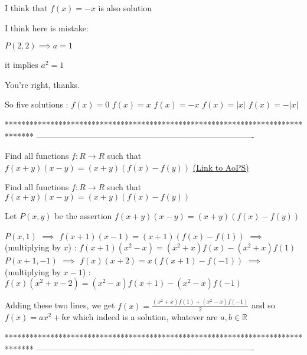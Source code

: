\begin{solution}
	I think that $f(x)=-x$ is also solution
\end{solution}



\begin{solution}
	I think here is mistake:
\begin{tcolorbox} $P(2,2)\implies a=1$\end{tcolorbox}
it implies $a^2=1$
\end{solution}



\begin{solution}
	You're right, thanks.

So five solutions :
$f(x)=0$
$f(x)=x$
$f(x)=-x$
$f(x)=|x|$
$f(x)=-|x|$
\end{solution}
*******************************************************************************
-------------------------------------------------------------------------------

\begin{problem}
	Find all functions $f:R\to R$ such that $f(x+y)(x-y)=(x+y)(f(x)-f(y))$
	\flushright \href{https://artofproblemsolving.com/community/c6h534246}{(Link to AoPS)}
\end{problem}



\begin{solution}
	\begin{tcolorbox}Find all functions $f:R\to R$ such that $f(x+y)(x-y)=(x+y)(f(x)-f(y))$\end{tcolorbox}
Let $P(x,y)$ be the assertion $f(x+y)(x-y)=(x+y)(f(x)-f(y))$

$P(x,1)$ $\implies$ $f(x+1)(x-1)=(x+1)(f(x)-f(1))$ $\implies$ (multiplying by $x$) : $f(x+1)(x^2-x)=(x^2+x)f(x)-(x^2+x)f(1)$
$P(x+1,-1)$ $\implies$ $f(x)(x+2)=x(f(x+1)-f(-1))$ $\implies$ (multiplying by $x-1$) : $f(x)(x^2+x-2)=(x^2-x)f(x+1)-(x^2-x)f(-1)$

Adding these two lines, we get $f(x)=\frac{(x^2+x)f(1)+(x^2-x)f(-1)}2$ and so $\boxed{f(x)=ax^2+bx}$ which indeed is a solution, whatever are $a,b\in\mathbb R$
\end{solution}
*******************************************************************************
-------------------------------------------------------------------------------

